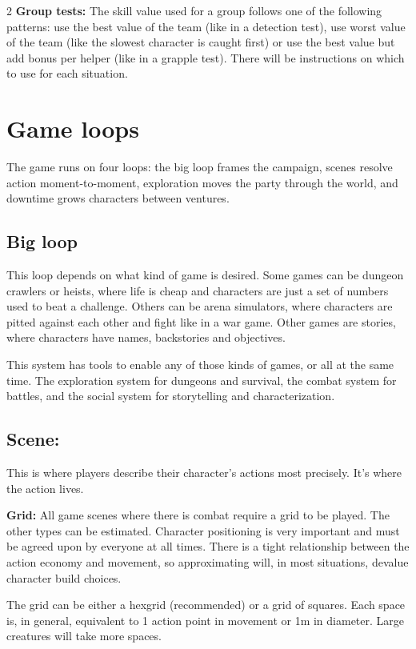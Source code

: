 \begin{multicols}{2}
\textbf{Group tests:} The skill value used for a group follows one of the following patterns: use the best value of the team (like in a detection test), use worst value of the team (like the slowest character is caught first) or use the best value but add bonus per helper (like in a grapple test). There will be instructions on which to use for each situation.

\section{Game loops}

The game runs on four loops: the big loop frames the campaign, scenes resolve action moment-to-moment, exploration moves the party through the world, and downtime grows characters between ventures.

\subsection{Big loop}

This loop depends on what kind of game is desired. Some games can be dungeon crawlers or heists, where life is cheap and characters are just a set of numbers used to beat a challenge. Others can be arena simulators, where characters are pitted against each other and fight like in a war game. Other games are stories, where characters have names, backstories and objectives. 

This system has tools to enable any of those kinds of games, or all at the same time. The exploration system for dungeons and survival, the combat system for battles, and the social system for storytelling and characterization.

\subsection{Scene:} This is where players describe their character's actions most precisely. It's where the action lives.

\textbf{Grid:} All game scenes where there is combat require a grid to be played. The other types can be estimated. Character positioning is very important and must be agreed upon by everyone at all times. There is a tight relationship between the action economy and movement, so approximating will, in most situations, devalue character build choices.

The grid can be either a hexgrid (recommended) or a grid of squares. Each space is, in general, equivalent to 1 action point in movement or 1m in diameter. Large creatures will take more spaces. 


\end{multicols}
